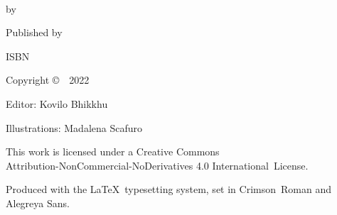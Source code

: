 \cleartoverso
\thispagestyle{empty}

{\copyrightsize
\centering
\setlength{\parindent}{0pt}%
\setlength{\parskip}{0.8\baselineskip}%

\thetitle\\
by \theauthor

Published by \thePublisher

ISBN \theISBN

Copyright \copyright\ \theauthor\ 2022

Editor: Kovilo Bhikkhu

Illustrations: Madalena Scafuro

\vfill

This work is licensed under a Creative Commons\\
Attribution-NonCommercial-NoDerivatives 4.0 International~License.

Produced with the \LaTeX\ typesetting system, set in Crimson~Roman and Alegreya Sans.

\theEditionInfo

}
